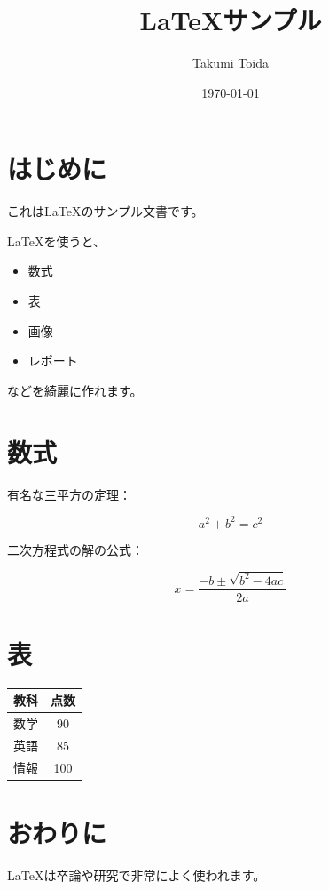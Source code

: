 \documentclass[uplatex,dvipdfmx]{jsarticle}
\title{LaTeXサンプル}
\author{Takumi Toida}
\date{\today}
\begin{document}
\maketitle

\section{はじめに}

これはLaTeXのサンプル文書です。

LaTeXを使うと、

\begin{itemize}
    \item 数式
    \item 表
    \item 画像
    \item レポート
\end{itemize}

などを綺麗に作れます。

\section{数式}

有名な三平方の定理：

\[
a^2 + b^2 = c^2
\]

二次方程式の解の公式：

\[
x = \frac{-b \pm \sqrt{b^2 - 4ac}}{2a}
\]

\section{表}

\begin{center}
\begin{tabular}{|c|c|}
\hline
教科 & 点数 \\
\hline
数学 & 90 \\
英語 & 85 \\
情報 & 100 \\
\hline
\end{tabular}
\end{center}

\section{おわりに}

LaTeXは卒論や研究で非常によく使われます。
\end{document}

